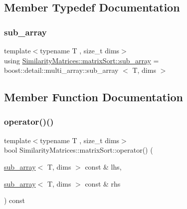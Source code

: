 \subsection{Member Typedef Documentation}
\mbox{\label{struct_similarity_matrices_1_1matrix_sort_ae39e66ff77c02f615725350ab7d68f71}} 
\subsubsection{\texorpdfstring{sub\+\_\+array}{sub\_array}}
{\footnotesize\ttfamily template$<$typename T , size\+\_\+t dims$>$ \\
using \mbox{\hyperlink{struct_similarity_matrices_1_1matrix_sort_ae39e66ff77c02f615725350ab7d68f71}{Similarity\+Matrices\+::matrix\+Sort\+::sub\+\_\+array}} =  boost\+::detail\+::multi\+\_\+array\+::sub\+\_\+array $<$ T, dims $>$}



\subsection{Member Function Documentation}
\mbox{\label{struct_similarity_matrices_1_1matrix_sort_adc975ab7262660216ad3a081c79e3672}} 
\subsubsection{\texorpdfstring{operator()()}{operator()()}\hspace{0.1cm}{\footnotesize\ttfamily [1/4]}}
{\footnotesize\ttfamily template$<$typename T , size\+\_\+t dims$>$ \\
bool Similarity\+Matrices\+::matrix\+Sort\+::operator() (\begin{DoxyParamCaption}\item[{\mbox{\hyperlink{struct_similarity_matrices_1_1matrix_sort_ae39e66ff77c02f615725350ab7d68f71}{sub\+\_\+array}}$<$ T, dims $>$ const \&}]{lhs,  }\item[{\mbox{\hyperlink{struct_similarity_matrices_1_1matrix_sort_ae39e66ff77c02f615725350ab7d68f71}{sub\+\_\+array}}$<$ T, dims $>$ const \&}]{rhs }\end{DoxyParamCaption}) const\hspace{0.3cm}{\ttfamily [inline]}}

